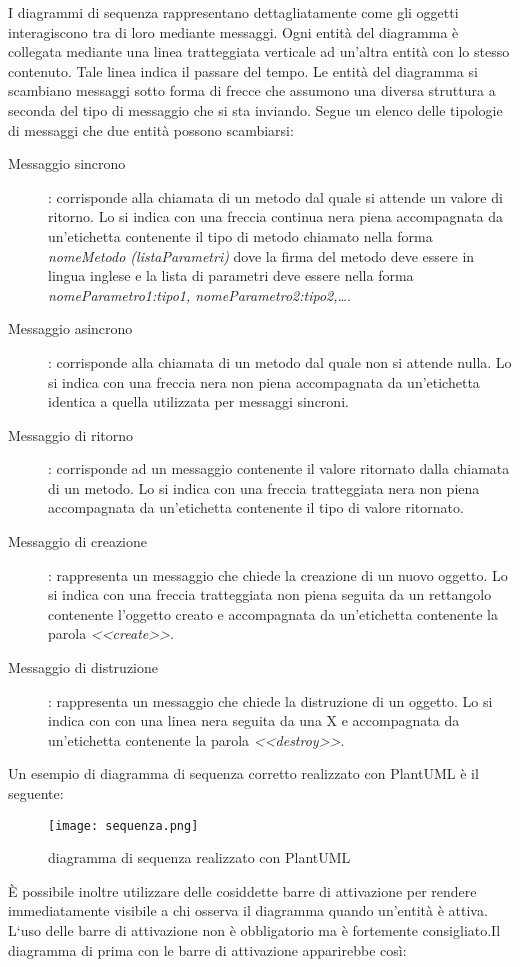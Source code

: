 \documentclass[../../norme-di-progetto.tex]{subfiles}
\begin{document}
I diagrammi di sequenza rappresentano dettagliatamente come gli oggetti interagiscono tra di loro mediante messaggi. Ogni entità del diagramma è collegata mediante una linea tratteggiata verticale ad un'altra entità con lo stesso contenuto. Tale linea indica il passare del tempo. Le entità del diagramma si scambiano messaggi sotto forma di frecce che assumono una diversa struttura a seconda del tipo di messaggio che si sta inviando. Segue un elenco delle tipologie di messaggi che due entità possono scambiarsi:
\begin{description}
  \item [Messaggio sincrono]: corrisponde alla chiamata di un metodo dal quale si attende un valore di ritorno. Lo si indica con una freccia continua nera piena accompagnata da un'etichetta contenente il tipo di metodo chiamato nella forma \textit{nomeMetodo (listaParametri)} dove la firma del metodo deve essere in lingua inglese e la lista di parametri deve essere nella forma \textit{nomeParametro1:tipo1, nomeParametro2:tipo2,\ldots}.
  \item [Messaggio asincrono]: corrisponde alla chiamata di un metodo dal quale non si attende nulla. Lo si indica con una freccia nera non piena accompagnata da un'etichetta identica a quella utilizzata per messaggi sincroni.
  \item [Messaggio di ritorno]: corrisponde ad un messaggio contenente il valore ritornato dalla chiamata di un metodo. Lo si indica con una freccia tratteggiata nera non piena accompagnata da un'etichetta contenente il tipo di valore ritornato.
  \item [Messaggio di creazione]: rappresenta un messaggio che chiede la creazione di un nuovo oggetto. Lo si indica con una freccia tratteggiata non piena seguita da un rettangolo contenente l'oggetto creato e accompagnata da un'etichetta contenente la parola \textit{<<create>>}.
  \item [Messaggio di distruzione]: rappresenta un messaggio che chiede la distruzione di un oggetto. Lo si indica con con una linea nera  seguita da una X e accompagnata da un'etichetta contenente la parola \textit{<<destroy>>}.
\end{description}
Un esempio di diagramma di sequenza corretto realizzato con PlantUML è il seguente:
\begin{figure}[H]%
  \label{fig:sequenza}
  \texttt{[image: sequenza.png]}
  \centering
  \caption{diagramma di sequenza realizzato con PlantUML}
\end{figure}
È possibile inoltre utilizzare delle cosiddette barre di attivazione per rendere immediatamente visibile a chi osserva il diagramma quando un'entità è attiva. L`uso delle barre di attivazione non è obbligatorio ma è fortemente consigliato.Il diagramma di prima con le barre di attivazione apparirebbe così:
\end{document}
